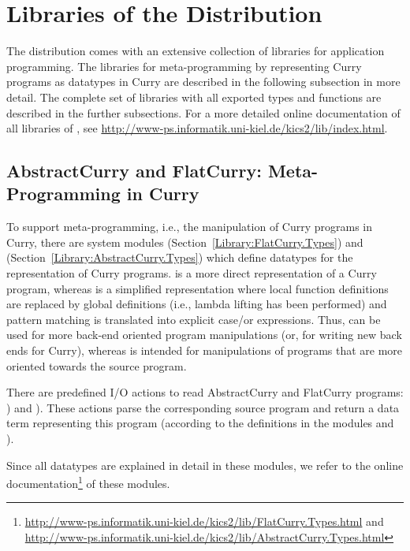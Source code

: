 \section{Libraries of the \CYS Distribution}
\label{sec:libraries}

{\setlength{\parindent}{0.0cm}

The \CYS distribution comes with an extensive collection
of libraries for application programming.
The libraries for meta-programming by representing
Curry programs as datatypes in Curry are described
in the following subsection in more detail.
The complete set of libraries with all exported types and functions
are described in the further subsections.
For a more detailed online documentation of all libraries of \CYS,
see \url{http://www-ps.informatik.uni-kiel.de/kics2/lib/index.html}.

\subsection{AbstractCurry and FlatCurry: Meta-Programming in Curry}
\label{sec-flatcurry}

To support meta-programming, i.e., the manipulation of Curry programs
in Curry, there are system modules
 (Section~\ref{Library:FlatCurry.Types})
and  (Section~\ref{Library:AbstractCurry.Types})
which define datatypes for the representation
of Curry programs.
 is a more direct representation of a Curry program,
whereas  is a simplified representation
where local function definitions are replaced by global definitions
(i.e., lambda lifting has been performed) and pattern matching
is translated into explicit case/or expressions.
Thus,  can be used for more back-end oriented
program manipulations (or, for writing new back ends for Curry),
whereas  is intended for manipulations of
programs that are more oriented towards the source program.

There are predefined I/O actions to read AbstractCurry and
FlatCurry programs: )
and ).
These actions parse the corresponding source program and return
a data term representing this program (according to the definitions
in the modules  and ).

Since all datatypes are explained in detail in these modules,
we refer to the online documentation\footnote{%
\url{http://www-ps.informatik.uni-kiel.de/kics2/lib/FlatCurry.Types.html} and
\url{http://www-ps.informatik.uni-kiel.de/kics2/lib/AbstractCurry.Types.html}}
of these modules.

}
